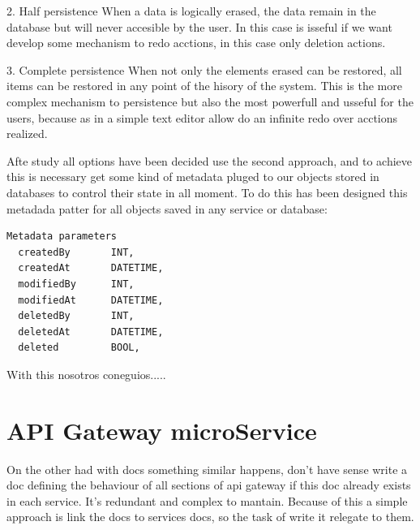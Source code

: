 2. Half persistence
When a data is logically erased, the data remain in the database but will never
accesible by the user. In this case is isseful if we want develop some mechanism
to redo acctions, in this case only deletion actions.

3. Complete persistence
When not only the elements erased can be restored, all items can be restored in
any point of the hisory of the system. This is the more complex mechanism to persistence
but also the most powerfull and usseful for the users, because as in a simple
text editor allow do an infinite redo over acctions realized.

Afte study all options have been decided use the second approach, and to achieve
this is necessary get some kind of metadata pluged to our objects stored in databases
to control their state in all moment.
To do this has been designed this metadada patter for all objects saved in any
service or database:

\begin{lstlisting}[language=python,frame=none]
  Metadata parameters
  createdBy       INT,
  createdAt       DATETIME,
  modifiedBy      INT,
  modifiedAt      DATETIME,
  deletedBy       INT,
  deletedAt       DATETIME,
  deleted         BOOL,

\end{lstlisting}

With this nosotros coneguios.....


\section{API Gateway microService}

On the other had with docs something similar happens, don't have sense
write a doc defining the behaviour of all sections of api gateway
if this doc already exists in each service. It's redundant and complex
to mantain. Because of this a simple approach is link the docs to
services docs, so the task of write it relegate to them.



